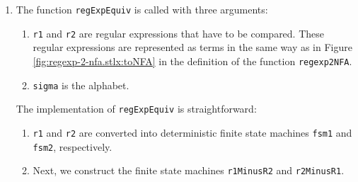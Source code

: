 \begin{enumerate}
\item The function \texttt{regExpEquiv} is called with three arguments: 
      \begin{enumerate}
      \item \texttt{r1} and \texttt{r2} are regular expressions that have to be
            compared.  These regular expressions are represented as terms in the same way
            as in Figure \ref{fig:regexp-2-nfa.stlx:toNFA} in the definition of the
            function \texttt{regexp2NFA}.
      \item \texttt{sigma} is the alphabet.
      \end{enumerate}
      The implementation of \texttt{regExpEquiv} is straightforward:
      \begin{enumerate}
      \item \texttt{r1} and \texttt{r2} are converted into deterministic finite state
            machines \texttt{fsm1} and \texttt{fsm2}, respectively.
      \item Next, we construct the finite state machines \texttt{r1MinusR2} and
            \texttt{r2MinusR1}.
            

\end{enumerate}
\end{enumerate}
